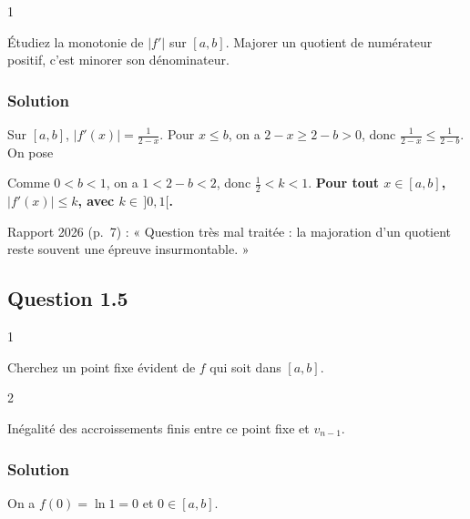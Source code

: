 \documentclass[11pt,a4paper]{article}
\newcommand{\equationajustee}[1]{%
  \sbox{\boiteequation}{$\displaystyle #1$}%
  \ifdim\wd\boiteequation>\linewidth
    \[\resizebox{\linewidth}{!}{\usebox{\boiteequation}}\]%
  \else
    \[#1\]%
  \fi}
\begin{document}
\begin{indication}{1}

Étudiez la monotonie de \(|f'|\) sur \([a,b]\). Majorer un quotient de numérateur positif, c'est minorer son dénominateur.

\end{indication}

\hypertarget{solution-16}{%
\subsubsection{Solution}\label{solution-16}}

Sur \([a,b]\), \(|f'(x)|=\frac1{2-x}\). Pour \(x\le b\), on a \(2-x\ge2-b>0\), donc \(\frac1{2-x}\le\frac1{2-b}\). On pose

\equationajustee{k=\frac1{2-\ln\frac32}.}

Comme \(0<b<1\), on a \(1<2-b<2\), donc \(\frac12<k<1\). \textbf{Pour tout \(x\in[a,b]\), \(|f'(x)|\le k\), avec \(k\in\,]0,1[\).}

\begin{jury}

Rapport 2026 (p.~7) : « Question très mal traitée : la majoration d'un quotient reste souvent une épreuve insurmontable. »

\end{jury}

\hypertarget{question-1.5}{%
\subsection{Question 1.5}\label{question-1.5}}

\begin{indication}{1}

Cherchez un point fixe évident de \(f\) qui soit dans \([a,b]\).

\end{indication}

\begin{indication}{2}

Inégalité des accroissements finis entre ce point fixe et \(v_{n-1}\).

\end{indication}

\hypertarget{solution-17}{%
\subsubsection{Solution}\label{solution-17}}

On a \(f(0)=\ln1=0\) et \(0\in[a,b]\).
\end{document}
